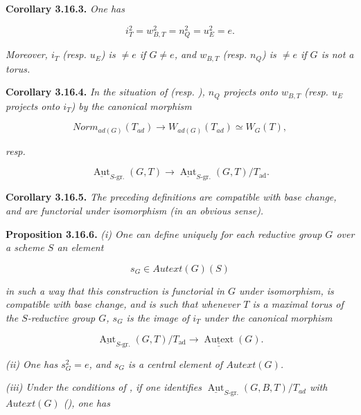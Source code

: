 \textbf{Corollary 3.16.3.} \emph{One has}

\[
  i_T^2=w_{B,T}^2=n_Q^2=u_E^2=e.
\]

\emph{Moreover, \(i_{T}\) (resp. \(u_{E}\)) is \(\neq e\) if \(G \neq e\), and \(w_{B, T}\) (resp. \(n_{Q}\)) is \(\neq e\) if \(G\) is not a
torus.}

\textbf{Corollary 3.16.4.} \emph{In the situation of  (resp. ), \(n_{Q}\) projects onto \(w_{B, T}\) (resp. \(u_{E}\) projects
onto \(i_{T}\)) by the canonical morphism}

\[ Norm_{ad(G)}(T_{ad}) \to W_{ad(G)}(T_{ad}) \simeq W_{G}(T), \]

\emph{resp.}

\[
  \underline{\operatorname{Aut}}_{S\text{-}\mathrm{gr.}}(G,T)
  \longrightarrow
  \underline{\operatorname{Aut}}_{S\text{-}\mathrm{gr.}}(G,T)/T_{\mathrm{ad}}.
\]

\textbf{Corollary 3.16.5.} \emph{The preceding definitions are compatible with base change, and are functorial under isomorphism
(in an obvious sense).}

\textbf{Proposition 3.16.6.} \emph{(i) One can define uniquely for each reductive group \(G\) over a scheme \(S\) an element}

\[ s_{G} \in Autext(G)(S) \]

\emph{in such a way that this construction is functorial in \(G\) under isomorphism, is compatible with base change, and is
such that whenever \(T\) is a maximal torus of the \(S\)-reductive group \(G\), \(s_{G}\) is the image of \(i_{T}\) under the
canonical morphism}

\[
  \underline{\operatorname{Aut}}_{S\text{-}\mathrm{gr.}}(G,T)/T_{\mathrm{ad}}
  \longrightarrow\underline{\underline{\operatorname{Autext}}}(G).
\]

\emph{(ii) One has \(s^{2}_{G} = e\), and \(s_{G}\) is a central element of \(Autext(G)\).}

\emph{(iii) Under the conditions of , if one identifies \(\underline{\operatorname{Aut}}_{S\text{-}\mathrm{gr.}}(G, B, T) / T_{ad}\) with
\(Autext(G)\) (), one has}

